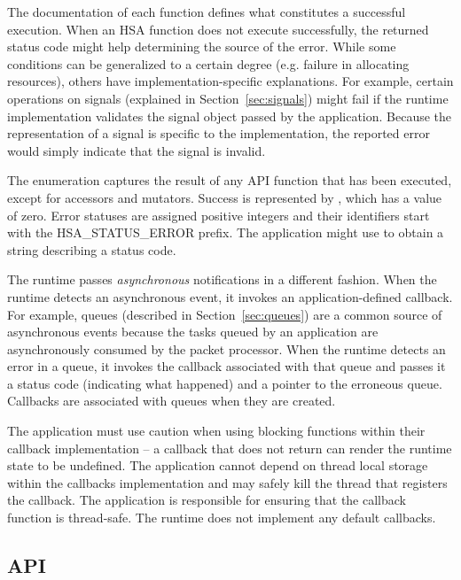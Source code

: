 \documentclass[final,oneside]{book}
\newcommand{\reftyp}[1]{#1}
\newcommand{\refenu}[1]{\reftyp{#1}}
\begin{document}
The documentation of each function defines what constitutes a successful
execution. When an HSA function does not execute successfully, the returned
status code might help determining the source of the error. While some
conditions can be generalized to a certain degree (e.g. failure in allocating
resources), others have implementation-specific explanations. For
example, certain operations on signals (explained in Section~\ref{sec:signals})
might fail if the runtime implementation validates the signal object passed by
the application. Because the representation of a signal is specific to the
implementation, the reported error would simply indicate that the signal is
invalid.

The  enumeration captures the result of any API function
that has been executed, except for accessors and mutators. Success is
represented by , which has a value of zero. Error
statuses are assigned positive integers and their identifiers start with the
\refenu{HSA_STATUS_ERROR} prefix. The application might use
 to obtain a string describing a status code.

The runtime passes \textit{asynchronous} notifications in a different
fashion. When the runtime detects an asynchronous event, it invokes an
application-defined callback. For example, queues (described in
Section~\ref{sec:queues}) are a common source of asynchronous events because the
tasks queued by an application are asynchronously consumed by the packet
processor. When the runtime detects an error in a queue, it invokes the callback
associated with that queue and passes it a status code (indicating what
happened) and a pointer to the erroneous queue. Callbacks are associated with
queues when they are created.

The application must use caution when using blocking functions within their
callback implementation -- a callback that does not return can render the
runtime state to be undefined. The application cannot depend on thread local
storage within the callbacks implementation and may safely kill the thread that
registers the callback. The application is responsible for ensuring that
the callback function is thread-safe. The runtime does not implement any default
callbacks.

\subsection{API}

\end{document}
